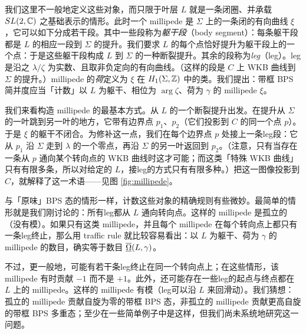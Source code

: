 我们这里不一般地定义这些对象，而只限于叶层 $L$ 就是一条闭圈、并承载 $SL(2,\mathbb{C})$ 之基础表示的情形。此时一个 millipede 是 $\Sigma$ 上的一条闭的有向曲线 $\xi$，它可以如下分成若干段。其中一些段称为\emph{躯干段}（body segment）：每条躯干段都是 $L$ 的相应一段到 $\Sigma$ 的提升。我们要求 $L$ 的每个点恰好提升为躯干段上的一个点：于是这些躯干段构成 $L$ 到 $\Sigma$ 的一种断裂提升。其余的段称为\emph{leg}（leg）。leg是沿之 $\lambda/\zeta$ 为实数、且取非负定向的有向曲线。（这样的段是 $C$ 上 WKB 曲线到 $\Sigma$ 的提升。）millipede 的\emph{荷}定义为 $\xi$ 在 $H_1(\Sigma, \mathbb{Z})$ 中的类。我们提出：带框 BPS 简并度应当「计数」以 $L$ 为躯干、相位为 $\arg \zeta$、荷为 $\gamma$ 的 millipede $\xi$。

我们来看构造 millipede 的最基本方式。从 $L$ 的一个断裂提升出发。在提升从 $\Sigma$ 的一叶跳到另一叶的地方，它带有边界点 $p_1$、$p_2$（它们投影到 $C$ 的同一个点 $p$）。于是 $\xi$ 的躯干不闭合。为修补这一点，我们在每个边界点 $p$ 处接上一条leg段：它从 $p_1$ 沿 $\Sigma$ 走到 $\lambda$ 的一个零点，再沿 $\Sigma$ 的另一叶返回到 $p_2$。（注意，只有当存在一条从 $p$ 通向某个转向点的 WKB 曲线时这才可能；而这类「特殊 WKB 曲线」只有有限多条，所以对给定的 $L$，接leg的方式只有有限多种。）把这一图像投影到 $C$，就解释了这一术语——见图 \ref{fig:millipede}。

与「原味」BPS 态的情形一样，计数这些对象的精确规则有些微妙。最简单的情形就是我们刚讨论的：所有leg都从 $L$ 通向转向点。这样的 millipede 是孤立的（没有模）。如果只有这类 millipede，并且每个 millipede 在每个转向点上都只有一条leg终止，那么用 traffic rule 就比较容易看出：以 $L$ 为躯干、荷为 $\gamma$ 的 millipede 的数目，确实等于数目 $\overline{\underline{\Omega}}(L, \gamma)$。

不过，更一般地，可能有若干条leg终止在同一个转向点上；在这些情形，该 millipede 有时贡献 $-1$ 而不是 $+1$。此外，还可能存在一些leg的起点与终点都在 $L$ 上的 millipede。这样的 millipede 有模（leg可以沿 $L$ 来回滑动）。我们猜想：孤立的 millipede 贡献自旋为零的带框 BPS 态，非孤立的 millipede 贡献更高自旋的带框 BPS 多重态；至少在一些简单例子中是这样，但我们尚未系统地研究这一问题。
